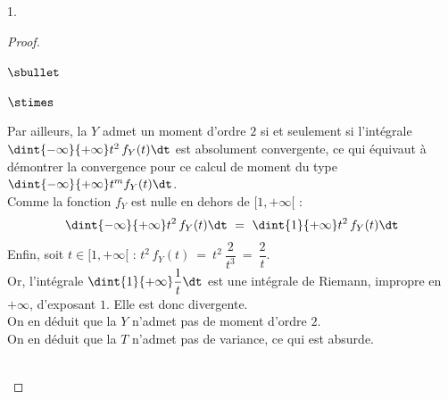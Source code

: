 \documentclass[11pt]{article}%
\begin{document}
\begin{noliste}{1.}
\begin{proof}
\begin{remarkL}{.98}
\begin{noliste}{$\sbullet$}
\begin{noliste}{$\stimes$}
        \item Par ailleurs, la \var $Y$ admet un moment d'ordre $2$ si
          et seulement si l'intégrale $\dint{-\infty}{+\infty} t^2 \,
          f_Y(t) \dt$ est absolument convergente, ce qui équivaut à
          démontrer la convergence pour ce calcul de moment du type
          $\dint{-\infty}{+\infty} t^m f_Y(t) \dt$.\\
          Comme la fonction $f_Y$ est nulle en dehors de $[1,+\infty[$
          :
          \[
          \dint{-\infty}{+\infty} t^2 \, f_Y(t) \dt \ = \
          \dint{1}{+\infty} t^2 \, f_Y(t) \dt
          \]
          Enfin, soit $t \in [1,+\infty[$ : $ t^2 \, f_Y(t) \ = \ t^2
          \ \dfrac{2}{t^3} \ = \ \dfrac{2}{t} $.\\
          Or, l'intégrale $\dint{1}{+\infty} \dfrac{1}{t} \dt$ est une
          intégrale de Riemann, impropre en $+\infty$, d'exposant
          $1$. Elle est donc divergente.\\
          On en déduit que la \var $Y$ n'admet pas de moment d'ordre
          $2$.\\
          On en déduit que la \var $T$ n'admet pas de variance, ce qui
          est absurde.
        \end{noliste}
      \end{noliste}
    \end{remarkL}~\\[-1.4cm]
  \end{proof}
\end{noliste}
\end{document}
